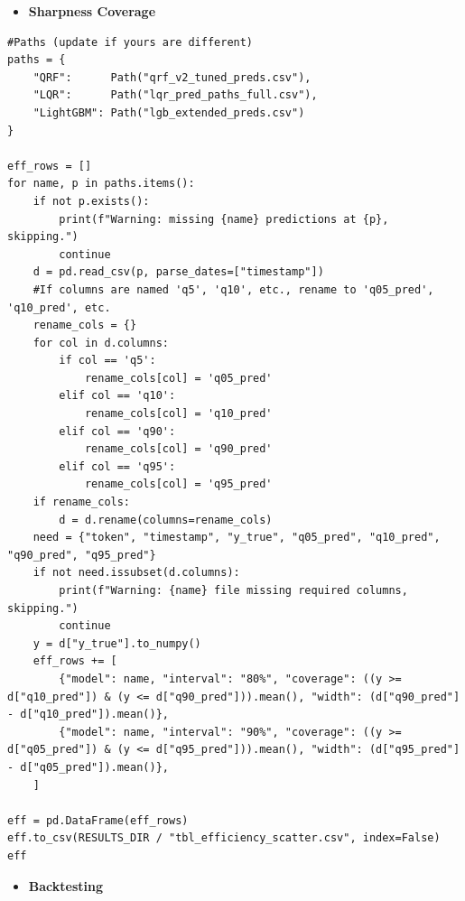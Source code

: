 \documentclass[
  a4paper,
  DIV=11,
  numbers=noendperiod]{scrreprt}
\providecommand{\tightlist}{%
  \setlength{\itemsep}{0pt}\setlength{\parskip}{0pt}}
\begin{document}
\begin{itemize}
\tightlist
\item
  \textbf{Sharpness Coverage}
\end{itemize}

\begin{verbatim}
#Paths (update if yours are different)
paths = {
    "QRF":      Path("qrf_v2_tuned_preds.csv"),
    "LQR":      Path("lqr_pred_paths_full.csv"),
    "LightGBM": Path("lgb_extended_preds.csv")
}

eff_rows = []
for name, p in paths.items():
    if not p.exists():
        print(f"Warning: missing {name} predictions at {p}, skipping.")
        continue
    d = pd.read_csv(p, parse_dates=["timestamp"])
    #If columns are named 'q5', 'q10', etc., rename to 'q05_pred', 'q10_pred', etc.
    rename_cols = {}
    for col in d.columns:
        if col == 'q5':
            rename_cols[col] = 'q05_pred'
        elif col == 'q10':
            rename_cols[col] = 'q10_pred'
        elif col == 'q90':
            rename_cols[col] = 'q90_pred'
        elif col == 'q95':
            rename_cols[col] = 'q95_pred'
    if rename_cols:
        d = d.rename(columns=rename_cols)
    need = {"token", "timestamp", "y_true", "q05_pred", "q10_pred", "q90_pred", "q95_pred"}
    if not need.issubset(d.columns):
        print(f"Warning: {name} file missing required columns, skipping.")
        continue
    y = d["y_true"].to_numpy()
    eff_rows += [
        {"model": name, "interval": "80%", "coverage": ((y >= d["q10_pred"]) & (y <= d["q90_pred"])).mean(), "width": (d["q90_pred"] - d["q10_pred"]).mean()},
        {"model": name, "interval": "90%", "coverage": ((y >= d["q05_pred"]) & (y <= d["q95_pred"])).mean(), "width": (d["q95_pred"] - d["q05_pred"]).mean()},
    ]

eff = pd.DataFrame(eff_rows)
eff.to_csv(RESULTS_DIR / "tbl_efficiency_scatter.csv", index=False)
eff
\end{verbatim}

\begin{itemize}
\tightlist
\item
  \textbf{Backtesting}
\end{itemize}
\end{document}

